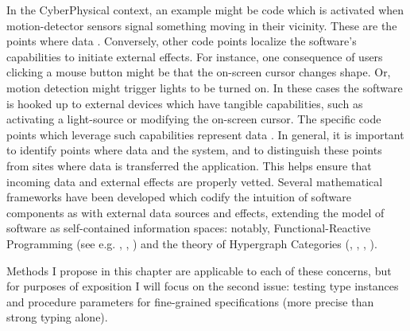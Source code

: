 {\begin{enumerate}
In the CyberPhysical context, an example might be code which 
is activated when motion-detector sensors signal something moving 
in their vicinity.  These are the  points where data 
.
\pseudoIndent{}
Conversely, other code points localize 
the software's capabilities to initiate external effects.  For 
instance, one consequence of users clicking a mouse button might 
be that the on-screen cursor changes shape.  Or, motion detection 
might trigger lights to be turned on.  In these cases the software 
is hooked up to external devices which have tangible capabilities, 
such as activating a light-source or modifying the on-screen cursor.  
The specific code points which leverage such capabilities 
represent data .  
\pseudoIndent{}
In general, it is important to identify points where data 
 and  the system, and to distinguish 
these points from sites where data is transferred 
 the application.  This helps ensure that 
incoming data and external effects are properly vetted.  
Several mathematical frameworks have been developed 
which codify the intuition of software components as 
 with external data sources and effects, 
extending the model of software as self-contained 
information spaces: notably, Functional-Reactive Programming 
(see e.g. \cite{WolfgangJeltsch}, \cite{JenniferPaykin},
\cite{PaykinKrishnaswami}) and the theory of
Hypergraph Categories 
(\cite{InteractingConceptualSpaces}, \cite{BrendanFong}, 
\cite{BrendanFongThesis}, \cite{AleksKissinger}). 
\end{enumerate}
Methods I propose in this chapter are applicable to each 
of these concerns, but for purposes of exposition I 
will focus on the second issue: testing 
type instances and procedure parameters for fine-grained 
specifications (more precise than strong typing alone). 
}
